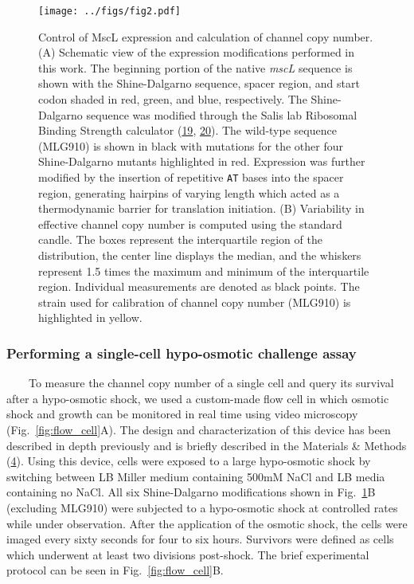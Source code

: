 \begin{figure}
\centering
\texttt{[image: ../figs/fig2.pdf]}
\caption{Control
of
MscL
expression
and
calculation
of
channel
copy
number.
(A)
Schematic
view
of the
expression
modifications
performed
in
this
work.
The
beginning
portion
of the
native
\emph{mscL}
sequence
is
shown
with
the
Shine-Dalgarno
sequence,
spacer
region,
and
start
codon
shaded
in
red,
green,
and
blue,
respectively.
The
Shine-Dalgarno
sequence
was
modified
through
the
Salis
lab
Ribosomal
Binding
Strength
calculator
(\protect\hyperlink{ref-espahborujeni2014}{19},
\protect\hyperlink{ref-salis2009}{20}).
The
wild-type
sequence
(MLG910)
is
shown
in
black
with
mutations
for
the
other
four
Shine-Dalgarno
mutants
highlighted
in
red.
Expression
was
further
modified
by the
insertion
of
repetitive
\texttt{AT}
bases
into
the
spacer
region,
generating
hairpins
of
varying
length
which
acted
as a
thermodynamic
barrier
for
translation
initiation.
(B)
Variability
in
effective
channel
copy
number
is
computed
using
the
standard
candle.
The
boxes
represent
the
interquartile
region
of the
distribution,
the
center
line
displays
the
median,
and
the
whiskers
represent
1.5
times
the
maximum
and
minimum
of the
interquartile
region.
Individual
measurements
are
denoted
as
black
points.
The
strain
used
for
calibration
of
channel
copy
number
(MLG910)
is
highlighted
in
yellow.}\label{fig:boxplot}
\end{figure}

\subsubsection{Performing
a
single-cell
hypo-osmotic
challenge
assay}\label{performing-a-single-cell-hypo-osmotic-challenge-assay}

~~~~To
measure
the
channel
copy
number
of a
single
cell
and
query
its
survival
after
a
hypo-osmotic
shock,
we
used a
custom-made
flow
cell
in
which
osmotic
shock
and
growth
can be
monitored
in
real
time
using
video
microscopy
(Fig.~\ref{fig:flow_cell}A).
The
design
and
characterization
of
this
device
has
been
described
in
depth
previously
and is
briefly
described
in the
Materials
\&
Methods
(\protect\hyperlink{ref-bialecka-fornal2015}{4}).
Using
this
device,
cells
were
exposed
to a
large
hypo-osmotic
shock
by
switching
between
LB
Miller
medium
containing
500mM
NaCl
and LB
media
containing
no
NaCl.
All
six
Shine-Dalgarno
modifications
shown
in
Fig.~\ref{fig:boxplot}B
(excluding
MLG910)
were
subjected
to a
hypo-osmotic
shock
at
controlled
rates
while
under
observation.
After
the
application
of the
osmotic
shock,
the
cells
were
imaged
every
sixty
seconds
for
four
to six
hours.
Survivors
were
defined
as
cells
which
underwent
at
least
two
divisions
post-shock.
The
brief
experimental
protocol
can be
seen
in
Fig.~\ref{fig:flow_cell}B.

